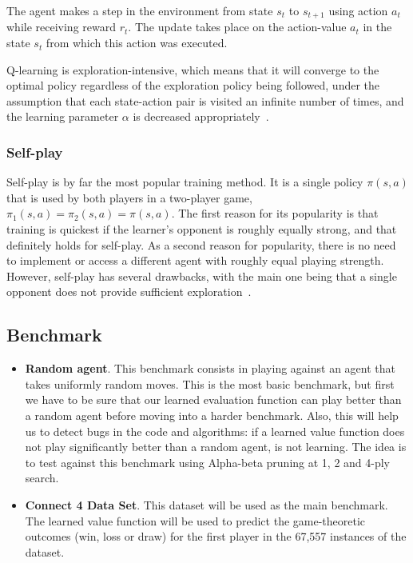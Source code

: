 \documentclass{article}
\begin{document}
The agent makes a step in the environment from state $s_t$ to $s_{t+1}$ using action $a_t$ while
receiving reward $r_t$. The update takes place on the action-value $a_t$ in the state $s_t$ from
which this action was executed.

Q-learning is exploration-intensive, which means that it will converge to the optimal policy
regardless of the exploration policy being followed, under the assumption that each state-action
pair is visited an infinite number of times, and the learning parameter $\alpha$ is decreased
appropriately~\citep{Watkins1992Q}.

\subsubsection{Self-play}

Self-play is by far the most popular training method. It is a single policy $\pi(s,a)$ that is used
by both players in a two-player game, $\pi_1(s,a) = \pi_2(s,a) = \pi(s,a)$. The first reason for its
popularity is that training is quickest if the learner's opponent is roughly equally strong, and
that definitely holds for self-play. As a second reason for popularity, there is no need to
implement or access a different agent with roughly equal playing strength. However, self-play has
several drawbacks, with the main one being that a single opponent does not provide sufficient
exploration~\citep{Szita2011RLGames}.

\subsection{Benchmark}
\label{sec:benchmark}

\begin{itemize}

    \item \textbf{Random agent}. This benchmark consists in playing against an agent that takes
        uniformly random moves. This is the most basic benchmark, but first we have to be sure that
        our learned evaluation function can play better than a random agent before moving into a
        harder benchmark. Also, this will help us to detect bugs in the code and algorithms: if a
        learned value function does not play significantly better than a random agent, is not
        learning. The idea is to test against this benchmark using Alpha-beta pruning at 1, 2 and
        4-ply search.

    \item \textbf{Connect 4 Data Set}. This dataset will be used as the main benchmark. The learned
        value function will be used to predict the game-theoretic outcomes (win, loss or draw) for
        the first player in the 67,557 instances of the dataset.

\end{itemize}
\end{document}
